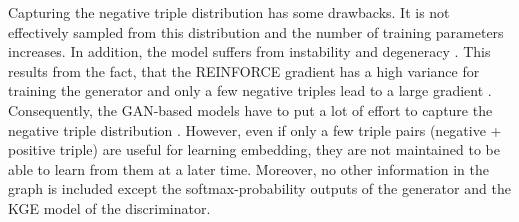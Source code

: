 Capturing the negative triple distribution has some drawbacks.
It is not effectively sampled from this distribution and the number of training parameters increases.
In addition, the model suffers from instability and degeneracy \cite{zhang2021efficient}.
This results from the fact, that the \textsc{REINFORCE} gradient has a high variance for training the generator and only a few negative triples lead to a large gradient \cite{zhang2021efficient}.
Consequently, the \ac{GAN}-based models have to put a lot of  effort to capture the negative triple distribution \cite{zhang2021efficient}.
However, even if only a few triple pairs (negative + positive triple) are useful for learning embedding, they are not maintained to be able to learn from them at a later time.
Moreover, no other information in the graph is included except the softmax-probability outputs of the generator and the \ac{KGE} model of the discriminator.